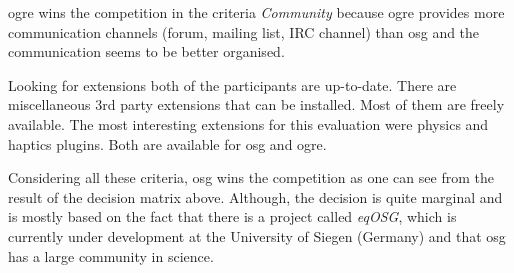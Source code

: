 \gls{ogre} wins the competition in the criteria \emph{Community} because \gls{ogre} provides more communication channels (forum, mailing list, IRC channel) than \gls{osg} and the communication seems to be better organised.

Looking for extensions both of the participants are up-to-date. There are miscellaneous 3rd party extensions that can be installed. Most of them are freely available. The most interesting extensions for this evaluation were physics and haptics plugins. Both are available for \gls{osg} and \gls{ogre}.

Considering all these criteria, \gls{osg} wins the competition as one can see from the result of the decision matrix above. Although, the decision is quite marginal and is mostly based on the fact that there is a project called \emph{eqOSG}, which is currently under development at the University of Siegen (Germany) and that \gls{osg} has a large community in science.
